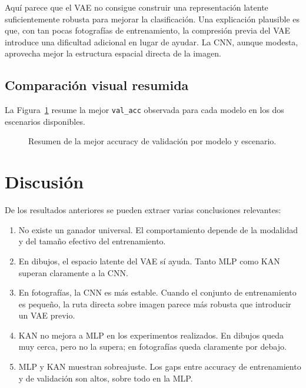 \documentclass[11pt,a4paper]{report}
\begin{document}
Aqu\'i parece que el VAE no consigue construir una representaci\'on latente suficientemente robusta para mejorar la clasificaci\'on. Una explicaci\'on plausible es que, con tan pocas fotograf\'ias de entrenamiento, la compresi\'on previa del VAE introduce una dificultad adicional en lugar de ayudar. La CNN, aunque modesta, aprovecha mejor la estructura espacial directa de la imagen.

\subsection{Comparaci\'on visual resumida}

La Figura~\ref{fig:barras-resumen} resume la mejor \texttt{val\_acc} observada para cada modelo en los dos escenarios disponibles.

\begin{figure}[H]
\centering
{}
\caption{Resumen de la mejor accuracy de validaci\'on por modelo y escenario.}
\label{fig:barras-resumen}
\end{figure}

\section{Discusi\'on}

De los resultados anteriores se pueden extraer varias conclusiones relevantes:

\begin{enumerate}
    \item No existe un ganador universal. El comportamiento depende de la modalidad y del tama\~no efectivo del entrenamiento.
    \item En dibujos, el espacio latente del VAE s\'i ayuda. Tanto MLP como KAN superan claramente a la CNN.
    \item En fotograf\'ias, la CNN es m\'as estable. Cuando el conjunto de entrenamiento es peque\~no, la ruta directa sobre imagen parece m\'as robusta que introducir un VAE previo.
    \item KAN no mejora a MLP en los experimentos realizados. En dibujos queda muy cerca, pero no la supera; en fotograf\'ias queda claramente por debajo.
    \item MLP y KAN muestran sobreajuste. Los gaps entre accuracy de entrenamiento y de validaci\'on son altos, sobre todo en la MLP.
\end{enumerate}
\end{document}
